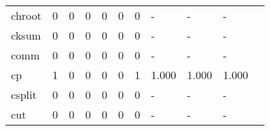\begin{longtable}{lp{1.2cm}p{1.2cm}p{1.2cm}p{1.2cm}p{1.2cm}p{1.2cm}p{1.2cm}p{1.2cm}p{1.2cm}p{1.2cm}}
chroot    &                                     0 &                                                  0 &                                                  0 &                                                  0 &                                                  0 &                                                  0 &                                                  - &                                                  - &                                                  - \\
cksum     &                                     0 &                                                  0 &                                                  0 &                                                  0 &                                                  0 &                                                  0 &                                                  - &                                                  - &                                                  - \\
comm      &                                     0 &                                                  0 &                                                  0 &                                                  0 &                                                  0 &                                                  0 &                                                  - &                                                  - &                                                  - \\
cp        &                                     1 &                                                  0 &                                                  0 &                                                  0 &                                                  0 &                                                  1 &                                              1.000 &                                              1.000 &                                              1.000 \\
csplit    &                                     0 &                                                  0 &                                                  0 &                                                  0 &                                                  0 &                                                  0 &                                                  - &                                                  - &                                                  - \\
cut       &                                     0 &                                                  0 &                                                  0 &                                                  0 &                                                  0 &                                                  0 &                                                  - &                                                  - &                                                  - \\

\end{longtable}
